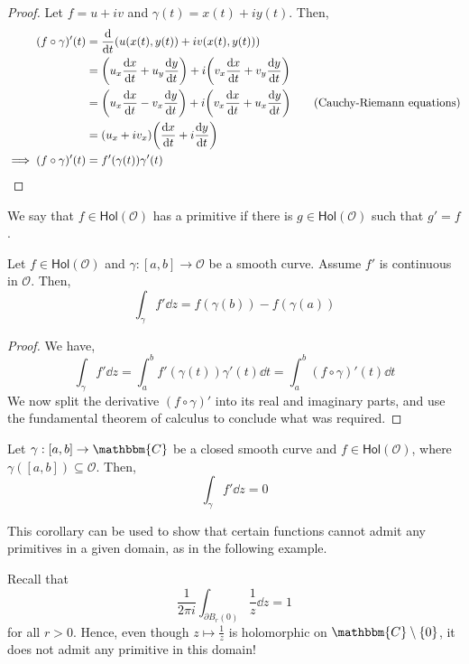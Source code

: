 \documentclass[../ComplexAnalysis_Notes.tex]{subfiles}
\begin{document}
\begin{proof} 
 Let \( f = u+iv \) and \( \gamma(t) = x(t)+iy(t) \). Then,
 \begin{align*}
   (f \circ \gamma)'(t) 
   &= \dv{t} \qty(u(x(t),y(t))+iv(x(t), y(t))) \\
   &= \qty(u_x \dv{x}{t} + u_y \dv{y}{t}) + i \qty(v_x \dv{x}{t} + v_y \dv{y}{t}) \\
   &= \qty(u_x \dv{x}{t} - v_x \dv{y}{t}) + i \qty(v_x \dv{x}{t} + u_x \dv{y}{t}) \tag{Cauchy-Riemann equations} \\
   &= (u_x+iv_x)\qty(\dv{x}{t}+i\dv{y}{t}) \\
   \implies (f \circ \gamma)'(t)
   &= f'(\gamma(t))\gamma'(t)
 \end{align*}
 \end{proof}


\begin{Def}{}{}
 We say that \( f \in \textsf{Hol}(\mathcal{O}) \) has a primitive if there is \( g \in \textsf{Hol}(\mathcal{O}) \) such that \( g' = f \).
 \end{Def}

\begin{Thm}{}{}
 Let \( f \in \textsf{Hol}(\mathcal{O}) \) and \( \gamma: [a,b] \to \mathcal{O} \) be a smooth curve. Assume \( f' \) is continuous in \( \mathcal{O} \). Then,
 \[ 
  \int_\gamma f' \dd{z} = f(\gamma(b)) - f(\gamma(a))
  \]
 \end{Thm}

\begin{proof} 
We have,
\[ 
  \int_\gamma f' \dd{z} = \int_a^b f'(\gamma(t))\gamma'(t) \dd{t} = \int_a^b (f \circ \gamma)'(t) \dd{t} 
 \]
We now split the derivative \( (f \circ \gamma)' \) into its real and imaginary parts, and use the fundamental theorem of calculus to conclude what was required.
\end{proof}

\begin{Cor}{}{}
 Let \( \gamma:[a,b] \to \mathbbm{C} \) be a closed smooth curve and \( f \in \textsf{Hol}(\mathcal{O}) \), where \( \gamma([a,b]) \subseteq \mathcal{O} \). Then,
 \[ 
  \int_\gamma f' \dd{z} = 0
  \]
 \end{Cor}

 This corollary can be used to show that certain functions cannot admit any primitives in a given domain, as in the following example.
\begin{Eg}{}{}
 Recall that
 \[ 
  \frac{1}{2\pi i} \int_{\partial B_r(0)} \frac{1}{z} \dd{z} = 1
  \]
  for all \( r > 0 \). Hence, even though \( z \mapsto \frac{1}{z} \) is holomorphic on \( \mathbbm{C} \setminus \qty{0} \), it does not admit any primitive in this domain!
 \end{Eg}
\end{document}
